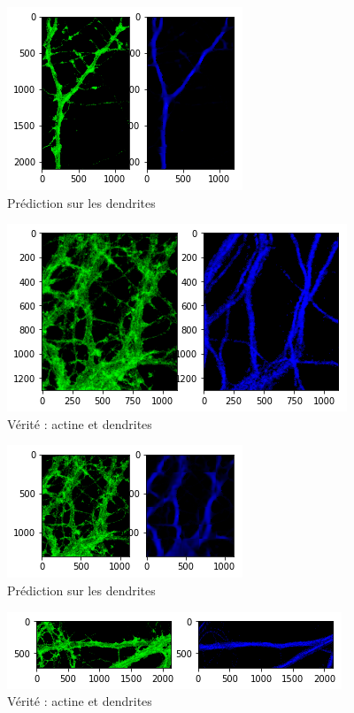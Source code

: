 \documentclass{report}
\begin{document}
\begin{figure}[H]
\centering
\includegraphics[scale=0.8]{"2_result"}
\caption{Prédiction sur les dendrites}
\end{figure}

\begin{figure}[H]
\centering
\includegraphics[scale=0.5]{"91_truth"}
\caption{Vérité : actine et dendrites}
\end{figure}

\begin{figure}[H]
\centering
\includegraphics[scale=0.8]{"91_result"}
\caption{Prédiction sur les dendrites}
\end{figure}

\begin{figure}[H]
\centering
\includegraphics[scale=0.5]{"397_truth"}
\caption{Vérité : actine et dendrites}
\end{figure}
\end{document}
